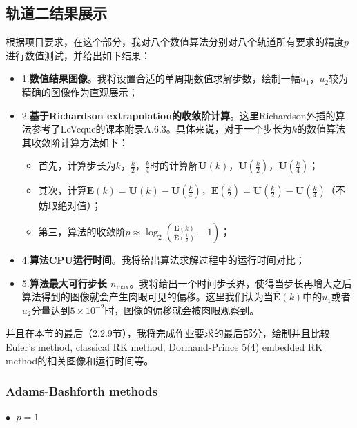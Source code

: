 \documentclass{ctexart}
\begin{document}
\begin{sloppypar}
\subsection{轨道二结果展示}
根据项目要求，在这个部分，我对八个数值算法分别对八个轨道所有要求的精度$p$进行数值测试，并给出如下结果：
\begin{itemize}
    \item 1.\textbf{数值结果图像}。我将设置合适的单周期数值求解步数，绘制一幅$u_1$，$u_2$较为精确的图像作为直观展示；
    \item 2.\textbf{基于Richardson extrapolation的收敛阶计算}。这里Richardson外插的算法参考了LeVeque的课本附录A.6.3。具体来说，对于一个步长为$k$的数值算法其收敛阶计算方法如下：
\begin{itemize}
    \item 首先，计算步长为$k$，$\frac{k}{2}$，$\frac{k}{4}$时的计算解$\mathbf{U}(k)$，$\mathbf{U}(\frac{k}{2})$，$\mathbf{U}(\frac{k}{4})$；
    \item 其次，计算$\overline{\mathbf{E}}(k) = \mathbf{U}(k)-\mathbf{U}(\frac{k}{4})$，$\overline{\mathbf{E}}(\frac{k}{2}) = \mathbf{U}(\frac{k}{2})-\mathbf{U}(\frac{k}{4})$（不妨取绝对值）；
    \item 第三，算法的收敛阶$p \approx \log_2 \left( \frac{\overline{\mathbf{E}}(k)}{\overline{\mathbf{E}}(\frac{k}{2})}-1 \right)$；
\end{itemize}
    \item 4.\textbf{算法CPU运行时间}。我将给出算法求解过程中的运行时间对比；
    \item 5.\textbf{算法最大可行步长 $n_{\max}$}。我将给出一个时间步长界，使得当步长再增大之后算法得到的图像就会产生肉眼可见的偏移。这里我们认为当$\overline{\mathbf{E}}(k)$中的$u_1$或者$u_2$分量达到$5 \times 10^{-2}$时，图像的偏移就会被肉眼观察到。
\end{itemize}
并且在本节的最后（2.2.9节），我将完成作业要求的最后部分，绘制并且比较Euler's method, classical RK method, Dormand-Prince 5(4) embedded RK method的相关图像和运行时间等。

\subsubsection{Adams-Bashforth methods}
$\bullet \;$ $p = 1$


\end{sloppypar}
\end{document}
